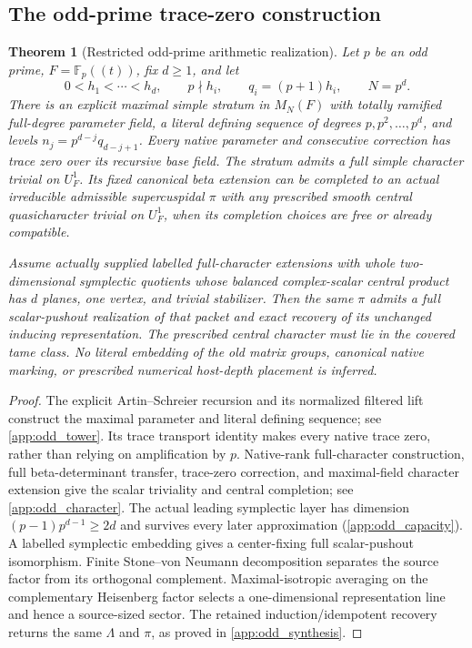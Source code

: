 \documentclass[11pt]{amsart}
\newtheorem{theorem}{Theorem}[section]
\theoremstyle{definition}
\theoremstyle{remark}
\newcommand{\FF}{\mathbb F}
\begin{document}
\subsection{The odd-prime trace-zero construction}

\begin{theorem}[Restricted odd-prime arithmetic realization]
\label{thm:odd_arithmetic}
Let \(p\) be an odd prime, \(F=\FF_p((t))\), fix \(d\ge1\), and let
\[
0<h_1<\cdots<h_d,\qquad p\nmid h_i,
\qquad q_i=(p+1)h_i,\qquad N=p^d.
\]
There is an explicit maximal simple stratum in \(M_N(F)\) with totally
ramified full-degree parameter field, a literal defining sequence of
degrees \(p,p^2,\ldots,p^d\), and levels
\(n_j=p^{d-j}q_{d-j+1}\). Every native parameter and consecutive
correction has trace zero over its recursive base field.
The stratum admits a full simple character trivial on \(U_F^1\).
Its fixed canonical beta extension can be completed to an actual
irreducible admissible supercuspidal \(\pi\) with any prescribed smooth
central quasicharacter trivial on \(U_F^1\), when its completion choices
are free or already compatible.

Assume actually supplied labelled full-character extensions with whole
two-dimensional symplectic quotients whose balanced complex-scalar
central product has \(d\) planes, one vertex, and trivial stabilizer.
Then the same \(\pi\) admits a full scalar-pushout realization of that
packet and exact recovery of its unchanged inducing representation.
The prescribed central character must lie in the covered tame class.
No literal embedding of the old matrix groups, canonical native marking,
or prescribed numerical host-depth placement is inferred.
\end{theorem}

\begin{proof}
The explicit Artin--Schreier recursion and its normalized filtered lift
construct the maximal parameter and literal defining sequence; see
\cref{app:odd_tower}. Its trace transport identity makes every native
trace zero, rather than relying on amplification by \(p\). Native-rank
full-character construction, full beta-determinant transfer, trace-zero
correction, and maximal-field character extension give the scalar
triviality and central completion; see \cref{app:odd_character}.
The actual leading symplectic layer has dimension
\((p-1)p^{d-1}\ge2d\) and survives every later approximation
(\cref{app:odd_capacity}). A labelled symplectic embedding gives a
center-fixing full scalar-pushout isomorphism. Finite Stone--von Neumann
decomposition separates the source factor from its orthogonal
complement. Maximal-isotropic averaging on the complementary Heisenberg
factor selects a one-dimensional representation line and hence a
source-sized sector. The retained induction/idempotent recovery returns the same
\(\Lambda\) and \(\pi\), as proved in \cref{app:odd_synthesis}.
\end{proof}
\end{document}
